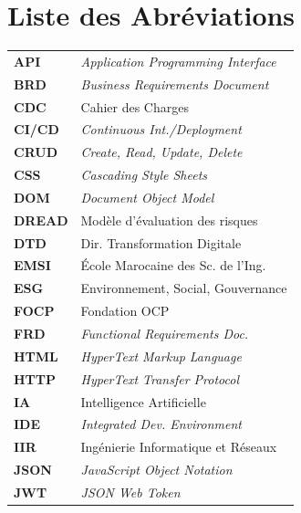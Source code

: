 \chapter*{Liste des Abréviations}

\noindent
\begin{minipage}[t]{0.48\textwidth}
\begin{tabularx}{\textwidth}{l X}
\textbf{API} & \textit{Application Programming Interface} \\
\textbf{BRD} & \textit{Business Requirements Document} \\
\textbf{CDC} & Cahier des Charges \\
\textbf{CI/CD} & \textit{Continuous Int./Deployment} \\
\textbf{CRUD} & \textit{Create, Read, Update, Delete} \\
\textbf{CSS} & \textit{Cascading Style Sheets} \\
\textbf{DOM} & \textit{Document Object Model} \\
\textbf{DREAD} & Modèle d'évaluation des risques \\
\textbf{DTD} & Dir. Transformation Digitale \\
\textbf{EMSI} & École Marocaine des Sc. de l'Ing. \\
\textbf{ESG} & Environnement, Social, Gouvernance \\
\textbf{FOCP} & Fondation OCP \\
\textbf{FRD} & \textit{Functional Requirements Doc.} \\
\textbf{HTML} & \textit{HyperText Markup Language} \\
\textbf{HTTP} & \textit{HyperText Transfer Protocol} \\
\textbf{IA} & Intelligence Artificielle \\
\textbf{IDE} & \textit{Integrated Dev. Environment} \\
\textbf{IIR} & Ingénierie Informatique et Réseaux \\
\textbf{JSON} & \textit{JavaScript Object Notation} \\
\textbf{JWT} & \textit{JSON Web Token} \\
\end{tabularx}
\end{minipage}
\hfill
